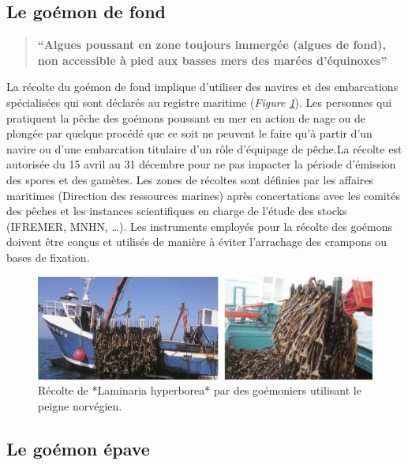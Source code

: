 \documentclass[
]{book}
\begin{document}
\hypertarget{le-gouxe9mon-de-fond}{%
\subsection{Le goémon de fond}\label{le-gouxe9mon-de-fond}}

\begin{quote}
\textbf{``Algues poussant en zone toujours immergée (algues de fond), non accessible à pied aux basses mers des marées d'équinoxes''}
\end{quote}

La récolte du goémon de fond implique d'utiliser des navires et des embarcations spécialisées qui sont déclarés au registre maritime (\emph{Figure \ref{fig:goemonierrecolte}}). Les personnes qui pratiquent la pêche des goémons poussant en mer en action de nage ou de plongée par quelque procédé que ce soit ne peuvent le faire qu'à partir d'un navire ou d'une embarcation titulaire d'un rôle d'équipage de pêche.La récolte est autorisée du 15 avril au 31 décembre pour ne pas impacter la période d'émission des spores et des gamètes. Les zones de récoltes sont définies par les affaires maritimes (Direction des ressources marines) après concertations avec les comités des pêches et les instances scientifiques en charge de l'étude des stocks (IFREMER, MNHN, \ldots). Les instruments employés pour la récolte des goémons doivent être conçus et utilisés de manière à éviter
l'arrachage des crampons ou bases de fixation.

\begin{figure}

{\centering \includegraphics{images/goemonier_recolte} 

}

\caption{Récolte de *Laminaria hyperborea* par des goémoniers utilisant le peigne norvégien.}\label{fig:goemonierrecolte}
\end{figure}

\hypertarget{le-gouxe9mon-uxe9pave}{%
\subsection{Le goémon épave}\label{le-gouxe9mon-uxe9pave}}
\end{document}
